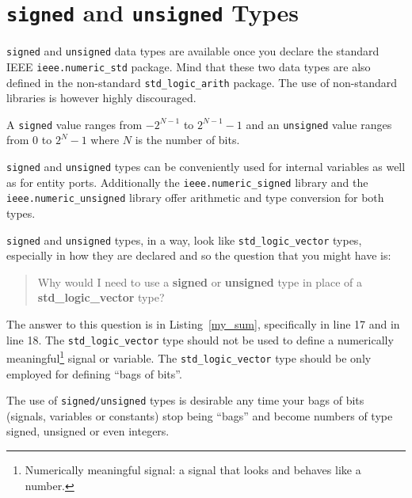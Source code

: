 \section{\texttt{signed} and \texttt{unsigned} Types}
\texttt{signed} and \texttt{unsigned} data types are available once you declare the standard IEEE \texttt{ieee.numeric\_std} package. Mind that these two data types are also defined in the non-standard \texttt{std\_logic\_arith} package. The use of non-standard libraries is however highly discouraged.

A \texttt{signed} value ranges from $-2^{N-1}$ to $2^{N-1}-1$ and an \texttt{unsigned} value ranges from $0$ to $2^N-1$ where $N$ is the number of bits.

\texttt{signed} and \texttt{unsigned} types can be conveniently used for internal variables as well as for entity ports. Additionally the \texttt{ieee.numeric\_signed} library and the \texttt{ieee.numeric\_unsigned} library offer arithmetic and type conversion for both types.

\texttt{signed} and \texttt{unsigned} types, in a way, look like \texttt{std\_logic\_vector} types, especially in how they are declared and so the question that you might have is:
\begin{quotation}\ttfamily
Why would I need to use a \textbf{\color{gray}signed} or \textbf{\color{gray}unsigned} type in place of a \textbf{\color{gray}std\_logic\_vector} type?
\end{quotation}
The answer to this question is in Listing~\ref{my_sum}, specifically in line 17 and in line 18. The \texttt{std\_logic\_vector} type should not be used to define a numerically meaningful\footnote{Numerically meaningful signal: a signal that looks and behaves like a number.} signal or variable. The \texttt{std\_logic\_vector} type should be only employed for defining ``bags of bits''.

The use of \texttt{signed/unsigned} types is desirable any time your bags of bits (signals, variables or constants) stop being ``bags'' and become numbers of type signed, unsigned or even integers.

